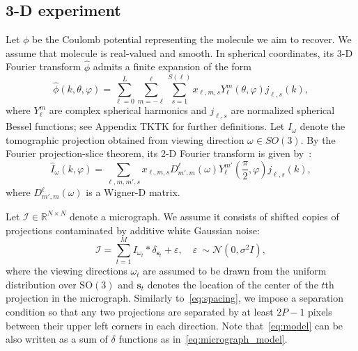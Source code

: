 \documentclass[english,11pt]{article}
\newcommand{\1}{\mathbf{1}}
\newcommand{\II}{\mathcal{I}}
\newcommand{\mb}{\mathbf}
\newcommand{\TODO}[1]{{\color{red}{[#1]}}}
\numberwithin{equation}{section}
\theoremstyle{plain}
\theoremstyle{definition}
\theoremstyle{remark}
\theoremstyle{plain}
\theoremstyle{remark}
\theoremstyle{plain}
\theoremstyle{plain}
\newcommand{\tamir}{x}
\newcommand{\RNN}{\mathbb{R}^{N\times N}}
\newcommand{\be}{\begin{equation}}
\newcommand{\ee}{\end{equation}}
\begin{document}
\subsection{3-D experiment}

Let $\phi$ be the Coulomb potential representing the molecule we aim to recover. 
We assume that molecule is real-valued and smooth. In spherical coordinates, its 3-D Fourier transform $\widehat\phi$ admits a finite expansion of the form
\be\label{eq:volume_expansion} 
\widehat \phi(k, \theta, \varphi) = \sum_{\ell = 0}^L\sum_{m=-\ell}^{\ell}\sum_{s=1}^{S(\ell)}\tamir_{\ell, m, s}Y_{\ell}^m(\theta,\varphi)j_{\ell,s}(k),
\ee
where $Y_{\ell}^m$ are complex spherical harmonics and $j_{\ell,s}$ are normalized spherical Bessel functions; see Appendix TKTK for further definitions.  Let $I_{\omega}$ denote the tomographic projection obtained from viewing direction $\omega\in SO(3)$. By the Fourier projection-slice theorem, its 2-D Fourier transform  is given by~\cite{natterer1986mathematics}:
\be\label{eq:projection_model}
\widehat I_{\omega}(k,\varphi) = \sum_{\ell,m,m',s}\tamir_{\ell,m,s}D_{m',m}^{\ell}(\omega)Y_{\ell}^{m'}\left(\frac{\pi}{2},\varphi\right)j_{\ell,s}(k),\ee
where $D_{m',m}^{\ell}(\omega)$ is a Wigner-D matrix.

Let $\II\in\RNN$ denote a micrograph. We assume it consists of shifted copies of projections contaminated by additive white Gaussian noise:
\begin{equation}\label{eq:micrograph_model}
\II = \sum_{t=1}^{M} I_{\omega_t}\ast\delta_{\mb s_t}+ \varepsilon, \quad \varepsilon~\sim\mathcal{N}(0,\sigma^2 I),
\end{equation}
where the viewing directions $\omega_t$ are assumed to be drawn from the uniform distribution over $\text{SO}(3)$ and $\mb s_t$ denotes the location of the center of the $t$th projection in the micrograph. Similarly to~\eqref{eq:spacing}, we impose a separation condition so that any two projections are separated by at least $2P-1$ pixels between their upper left corners  in each direction.
Note that~\eqref{eq:model} can be also written as a sum of $\delta$ functions as in~\eqref{eq:micrograph_model}. 
\end{document}
